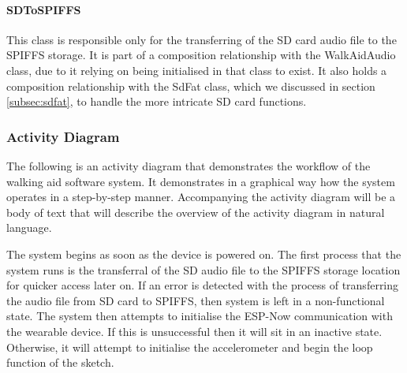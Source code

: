                 \paragraph{SDToSPIFFS}\mbox{}

                    This class is responsible only for the transferring of the SD card audio file to the SPIFFS storage. It is part of a composition relationship with the WalkAidAudio class, due to it relying on being initialised in that class to exist. It also holds a composition relationship with the SdFat class, which we discussed in section \ref{subsec:sdfat}, to handle the more intricate SD card functions. 
                
                \newpage

            \subsubsection{Activity Diagram}
            \label{subsubsec:walking_aid_activity}

                The following is an activity diagram that demonstrates the workflow of the walking aid software system. It demonstrates in a graphical way how the system operates in a step-by-step manner. Accompanying the activity diagram will be a body of text that will describe the overview of the activity diagram in natural language.

                
                
                The system begins as soon as the device is powered on. The first process that the system runs is the transferral of the SD audio file to the SPIFFS storage location for quicker access later on. If an error is detected with the process of transferring the audio file from SD card to SPIFFS, then system is left in a non-functional state. The system then attempts to initialise the ESP-Now communication with the wearable device. If this is unsuccessful then it will sit in an inactive state. Otherwise, it will attempt to initialise the accelerometer and begin the loop function of the sketch. 


